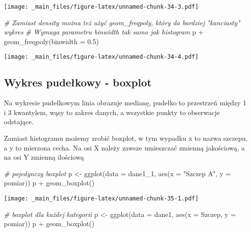 \documentclass[
]{book}
\newenvironment{Shaded}{\begin{snugshade}}{\end{snugshade}}
\newcommand{\AttributeTok}[1]{\textcolor[rgb]{0.77,0.63,0.00}{#1}}
\newcommand{\CommentTok}[1]{\textcolor[rgb]{0.56,0.35,0.01}{\textit{#1}}}
\newcommand{\FloatTok}[1]{\textcolor[rgb]{0.00,0.00,0.81}{#1}}
\newcommand{\FunctionTok}[1]{\textcolor[rgb]{0.00,0.00,0.00}{#1}}
\newcommand{\NormalTok}[1]{#1}
\newcommand{\OtherTok}[1]{\textcolor[rgb]{0.56,0.35,0.01}{#1}}
\newcommand{\SpecialCharTok}[1]{\textcolor[rgb]{0.00,0.00,0.00}{#1}}
\newcommand{\StringTok}[1]{\textcolor[rgb]{0.31,0.60,0.02}{#1}}
\begin{document}
\texttt{[image: \_main\_files/figure-latex/unnamed-chunk-34-3.pdf]}

\begin{Shaded}
\begin{Highlighting}[]
\CommentTok{\# Zamiast density można też użyć geom\_freqpoly, który da bardziej "kanciasty" wykres}
\CommentTok{\# Wymaga parametru binwidth tak samo jak histogram}
\NormalTok{p }\SpecialCharTok{+} \FunctionTok{geom\_freqpoly}\NormalTok{(}\AttributeTok{binwidth =} \FloatTok{0.5}\NormalTok{)}
\end{Highlighting}
\end{Shaded}

\texttt{[image: \_main\_files/figure-latex/unnamed-chunk-34-4.pdf]}

\hypertarget{wykres-pudeux142kowy---boxplot}{%
\subsection{Wykres pudełkowy - boxplot}\label{wykres-pudeux142kowy---boxplot}}

Na wykresie pudełkowym linia obrazuje medianę, pudełko to przestrzeń między 1 i 3 kwantylem, wąsy to zakres danych, a wszystkie punkty to obserwacje odstające.

Zamiast histogramu możemy zrobić boxplot, w tym wypadku x to nazwa szczepu, a y to mierzona cecha. Na osi X należy zawsze umieszczać zmienną jakościową, a na osi Y zmienną ilościową

\begin{Shaded}
\begin{Highlighting}[]
\CommentTok{\# pojedynczy boxplot}
\NormalTok{p }\OtherTok{\textless{}{-}} \FunctionTok{ggplot}\NormalTok{(}\AttributeTok{data =}\NormalTok{ dane1\_1, }\FunctionTok{aes}\NormalTok{(}\AttributeTok{x =} \StringTok{"Szczep A"}\NormalTok{, }\AttributeTok{y =}\NormalTok{ pomiar))}
\NormalTok{p }\SpecialCharTok{+} \FunctionTok{geom\_boxplot}\NormalTok{()}
\end{Highlighting}
\end{Shaded}

\texttt{[image: \_main\_files/figure-latex/unnamed-chunk-35-1.pdf]}

\begin{Shaded}
\begin{Highlighting}[]
\CommentTok{\# boxplot dla każdej kategorii}
\NormalTok{p }\OtherTok{\textless{}{-}} \FunctionTok{ggplot}\NormalTok{(}\AttributeTok{data =}\NormalTok{ dane1, }\FunctionTok{aes}\NormalTok{(}\AttributeTok{x =}\NormalTok{ Szczep, }\AttributeTok{y =}\NormalTok{ pomiar))}
\NormalTok{p }\SpecialCharTok{+} \FunctionTok{geom\_boxplot}\NormalTok{()}
\end{Highlighting}
\end{Shaded}
\end{document}
